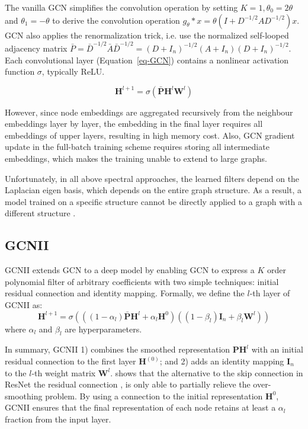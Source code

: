 \documentclass{article}
\begin{document}
The vanilla GCN \cite{kipf2016semi} simplifies the convolution operation by setting $K=1,\theta_0=2\theta$ and $\theta_1=-\theta$ to derive the convolution operation $g_{\theta}\ast x =\theta(I+D^{-1/2}AD^{-1/2})x$. GCN also applies the renormalization trick, i.e. use the normalized self-looped adjacency matrix $\bar{P} = \bar{D}^{-1/2}\bar{A}\bar{D}^{-1/2}=(D+I_n)^{-1/2}(A+I_n)(D+I_n)^{-1/2}$. Each convolutional layer (Equation~\ref{eq-GCN}) contains a nonlinear
activation function $\sigma$, typically ReLU.

\begin{equation} 
    \mathbf{H}^{l+1} = \sigma\left(\bar{\mathbf{P}}\mathbf{H}^l\mathbf{W}^l\right) 
    \label{eq-GCN}
\end{equation} 

However, since node embeddings are aggregated recursively from the neighbour embeddings layer by layer, the embedding in the final layer requires all embeddings of upper layers, resulting in high memory cost. Also, GCN gradient update in the full-batch training scheme requires storing all intermediate embeddings, which makes the training unable to extend to large graphs. 

Unfortunately, in all above spectral approaches, the learned filters depend on the Laplacian eigen basis, which depends on the entire graph structure. As a result, a model trained on a specific structure cannot be directly applied to a graph with a different structure \cite{velivckovic2018graph}.

\subsection{GCNII} \label{GCNII}
GCNII \cite{chen2020simple} extends GCN to a deep model by enabling GCN to express a $K$ order polynomial filter of arbitrary coefficients with two simple techniques: initial residual connection and identity mapping. Formally, we define the $l$-th layer of GCNII as:
\begin{equation}
    \mathbf{H}^{l+1}=\sigma\left(\left(\left(1-\alpha_l\right)\bar{\mathbf{P}}\mathbf{H}^l+\alpha_l\mathbf{H}^{0}\right)\left(\left(1-\beta_l\right)\mathbf{I}_{n} +\beta_l\mathbf{W}^l\right)\right)
    \label{eq-GCNII}
\end{equation} 
where $\alpha_l$ and $\beta_l$ are hyperparameters. 

In summary, GCNII 1) combines the smoothed representation $\mathbf{P}\mathbf{H}^l$ with an initial residual connection to the first layer $\mathbf{H}^{(0)}$; and 2) adds an identity mapping $\mathbf{I}_{n}$ to the $l$-th weight matrix $\mathbf{W}^l$. \citet{chen2020simple} shows that the alternative to the skip connection in ResNet \cite{he2016identity} the residual connection \cite{kipf2016semi}, is only able to partially relieve the over-smoothing problem. By using a connection to the initial representation $\mathbf{H}^0$, GCNII ensures that the final representation of each node retains at least a $\alpha_l$ fraction from the input layer. 
\end{document}
